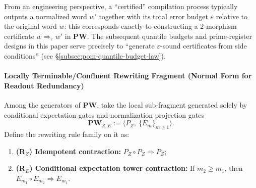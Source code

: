\begin{remark}\label{rem:pom-compile-output-word-eps}
From an engineering perspective, a ``certified'' compilation process typically outputs a normalized word \(w'\) together with its total error budget \(\varepsilon\) relative to the original word \(w\):
this corresponds exactly to constructing a \(2\)-morphism certificate \(w\Longrightarrow_{\varepsilon} w'\) in \(\mathbf{PW}\).
The subsequent quantile budgets and prime-register designs in this paper serve precisely to ``generate \(\varepsilon\)-sound certificates from side conditions'' (see \S\ref{subsec:pom-quantile-budget-law}).
\end{remark}

\paragraph{Locally Terminable/Confluent Rewriting Fragment (Normal Form for Readout Redundancy)}
\begin{definition}\label{def:pom-rewrite-E-tower}
Among the generators of $\mathbf{PW}$, take the local sub-fragment generated solely by conditional expectation gates and normalization projection gates
\[
\mathbf{PW}_{Z,E}:=\langle P_Z,\ \{E_m\}_{m\ge 1}\rangle.
\]
Define the rewriting rule family on it as:
\begin{enumerate}
  \item \textbf{(R$_Z$) Idempotent contraction:} $P_Z\circ P_Z\Rightarrow P_Z$;
  \item \textbf{(R$_E$) Conditional expectation tower contraction:} If $m_2\ge m_1$, then $E_{m_1}\circ E_{m_2}\Rightarrow E_{m_1}$.
\end{enumerate}
\end{definition}

